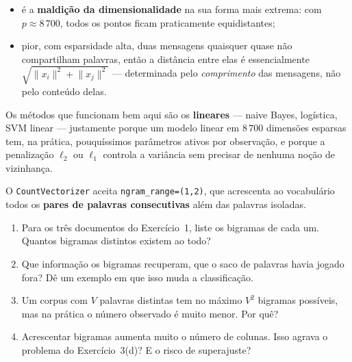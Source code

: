 \documentclass[11pt,a4paper]{article}
\begin{document}
\begin{solucao}
\begin{itemize}[leftmargin=1.4cm]
  \item é a \textbf{maldição da dimensionalidade} na sua forma mais
        extrema: com $p\approx 8\,700$, todos os pontos ficam praticamente
        equidistantes;
  \item pior, com esparsidade alta, duas mensagens quaisquer quase não
        compartilham palavras, então a distância entre elas é essencialmente
        $\sqrt{\lVert x_i\rVert^2 + \lVert x_j\rVert^2}$ --- determinada pelo
        \emph{comprimento} das mensagens, não pelo conteúdo delas.
\end{itemize}

Os métodos que funcionam bem aqui são os \textbf{lineares} --- naive Bayes,
logística, SVM linear --- justamente porque um modelo linear em $8\,700$
dimensões esparsas tem, na prática, pouquíssimos parâmetros ativos por
observação, e porque a penalização $\ell_2$ ou $\ell_1$ controla a variância sem
precisar de nenhuma noção de vizinhança.
\end{solucao}

\begin{exercicio}
O \texttt{CountVectorizer} aceita \texttt{ngram\_range=(1,2)}, que acrescenta ao
vocabulário todos os \textbf{pares de palavras consecutivas} além das palavras
isoladas.
\begin{enumerate}[label=(\alph*),leftmargin=1.1cm]
  \item Para os três documentos do Exercício~1, liste os bigramas de cada um.
        Quantos bigramas distintos existem ao todo?
  \item Que informação os bigramas recuperam, que o saco de palavras havia
        jogado fora? Dê um exemplo em que isso muda a classificação.
  \item Um corpus com $V$ palavras distintas tem no máximo $V^2$ bigramas
        possíveis, mas na prática o número observado é muito menor. Por quê?
  \item Acrescentar bigramas aumenta muito o número de colunas. Isso agrava o
        problema do Exercício~3(d)? E o risco de superajuste?
\end{enumerate}
\end{exercicio}
\end{document}
